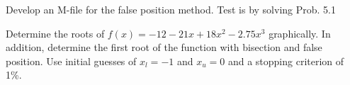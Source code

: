\documentclass{article}
\begin{document}
\begin{problem}

	Develop an M-file for the false position method. Test is by solving Prob. 5.1
	
\end{problem}

\setcounter{problem}{6}
\begin{problem}

	Determine the roots of $f(x)=-12-21x+18x^{2}-2.75x^{3}$ graphically. In addition, determine the first root of the function with bisection and false position. Use initial guesses of $x_{l}=-1$ and $x_{u}=0$ and a stopping criterion of 1\%.
	
\end{problem}
\end{document}
